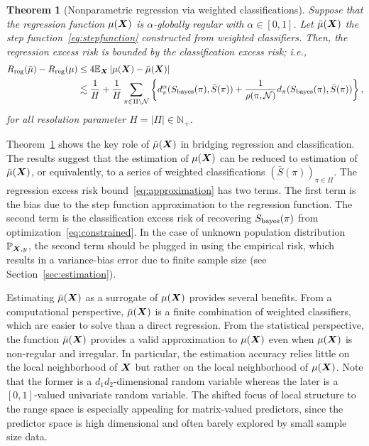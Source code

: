 \documentclass[11pt]{article}
\theoremstyle{plain}
\newtheorem{thm}{Theorem}
\theoremstyle{definition}
\def\bayesS{S_{\textup{bayes}}}
\begin{document}
\begin{thm}[Nonparametric regression via weighted classifications]\label{thm:twobounds} Suppose that the regression function $\mu(\bm X)$ is $\alpha$-globally regular with $\alpha\in[0,1]$. Let $\bar \mu(\bm X)$ the step function~\eqref{eq:stepfunction} constructed from weighted classifiers. Then, the regression excess risk is bounded by the classification excess risk; i.e.,
\begin{align}\label{eq:approximation}
R_{\textup{reg}}(\bar \mu) - R_{\textup{reg}}(\mu)&\leq 4\mathbb{E}_{\mX}\left|  \mu(\mX)-\bar \mu(\mX)\right|\notag\\
&\lesssim {1\over H}+ \frac{1}{H}\sum_{\pi\in\Pi\setminus\tN}\left\{d_\pi^{\alpha}(\bayesS(\pi),\bar S(\pi))+ {1\over\rho(\pi, \tN)} d_\pi(\bayesS(\pi),\bar S(\pi))\right\},
\end{align}
for all resolution parameter $H=|\Pi|\in \mathbb{N}_{+}$. 

\end{thm}

Theorem~\ref{thm:twobounds} shows the key role of $\bar \mu(\bm X)$ in bridging regression and classification. The results suggest that the estimation of $\mu(\bm X)$ can be reduced to estimation of $\bar \mu(\bm X)$, or equivalently, to a series of weighted classifications $(\bar S(\pi))_{\pi\in\Pi}$. The regression excess risk bound~\eqref{eq:approximation} has two terms. The first term is the bias due to the step function approximation to the regression function. The second term is the classification excess risk of recovering $\bayesS(\pi)$ from optimization~\eqref{eq:constrained}. In the case of unknown population distribution $\mathbb{P}_{\bm X,y}$, the second term should be plugged in using the empirical risk, which results in a variance-bias error due to finite sample size (see Section~\ref{sec:estimation}). 

Estimating $\bar \mu(\bm X)$ as a surrogate of $\mu(\bm X)$ provides several benefits. From a computational perspective, $\bar \mu(\bm X)$ is a finite combination of weighted classifiers, which are easier to solve than a direct regression. From the statistical perspective, the function $\bar \mu(\bm X)$ provides a valid approximation to $\mu(\bm X)$ even when $\mu(\bm X)$ is non-regular and irregular. In particular, the estimation accuracy relies little on the local neighborhood of $\bm X$ but rather on the local neighborhood of $\mu(\bm X)$. Note that the former is a $d_1d_2$-dimensional random variable whereas the later is a $[0,1]$-valued univariate random variable. The shifted focus of local structure to the range space is especially appealing for matrix-valued predictors, since the predictor space is high dimensional and often barely explored by small sample size data.  
\end{document}
